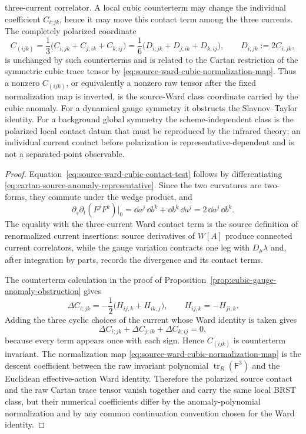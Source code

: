 \begin{proposition}
three-current correlator.  A local cubic counterterm may change the individual
coefficient \(C_{i;jk}\), hence it may move this contact term among the three
currents.  The completely polarized coordinate
\begin{equation}
  C_{(ijk)}
  =
  \frac13\bigl(C_{i;jk}+C_{j;ik}+C_{k;ij}\bigr)
  =
  \frac16\bigl(
    D_{i;jk}+D_{j;ik}+D_{k;ij}
  \bigr),
  \qquad
  D_{i;jk}:=2C_{i;jk},
  \label{eq:source-ward-polarized-cubic-coordinate}
\end{equation}
is unchanged by such counterterms and is related to the Cartan restriction of
the symmetric cubic trace tensor by
\eqref{eq:source-ward-cubic-normalization-map}.  Thus a nonzero
\(C_{(ijk)}\), or equivalently a nonzero raw tensor after the fixed
normalization map is inverted, is the source-Ward class coordinate carried by
the cubic anomaly.  For a dynamical gauge symmetry it obstructs the
Slavnov--Taylor identity.  For a background global symmetry the
scheme-independent class is the polarized local contact datum that must be
reproduced by the infrared theory; an individual current contact before
polarization is representative-dependent and is not a separated-point
observable.
\end{proposition}

\begin{proof}
Equation~\eqref{eq:source-ward-cubic-contact-test} follows by differentiating
\eqref{eq:cartan-source-anomaly-representative}.  Since the two curvatures
are two-forms, they commute under the wedge product, and
\[
  \partial_s\partial_t(F^jF^k)\big|_{0}
  =
  \dd a^j\,\dd b^k+\dd b^k\,\dd a^j
  =
  2\,\dd a^j\,\dd b^k .
\]
The equality with the three-current Ward contact term is the source
definition of renormalized current insertions: source derivatives of \(W[A]\)
produce connected current correlators, while the gauge variation contracts one
leg with \(D_\mu\lambda\) and, after integration by parts, records the
divergence and its contact terms.

The counterterm calculation in the proof of
Proposition~\ref{prop:cubic-gauge-anomaly-obstruction} gives
\[
  \Delta C_{i;jk}
  =
  -\frac12\bigl(H_{ij,k}+H_{ik,j}\bigr),
  \qquad H_{ij,k}=-H_{ji,k}.
\]
Adding the three cyclic choices of the current whose Ward identity is taken
gives
\[
  \Delta C_{i;jk}+\Delta C_{j;ik}+\Delta C_{k;ij}=0,
\]
because every term appears once with each sign.  Hence
\(C_{(ijk)}\) is counterterm invariant.  The normalization map
\eqref{eq:source-ward-cubic-normalization-map} is the descent coefficient
between the raw invariant polynomial
\(\operatorname{tr}_R(\mathsf F^3)\) and the Euclidean effective-action Ward
identity.  Therefore the polarized source contact and the raw Cartan trace
tensor vanish together and carry the same local BRST class, but their numerical
coefficients differ by the anomaly-polynomial normalization and by any common
continuation convention chosen for the Ward identity.
\end{proof}

